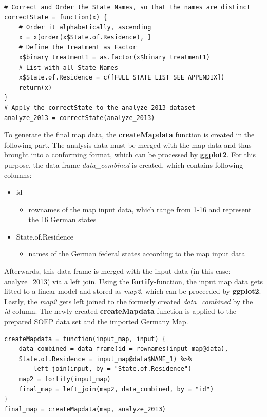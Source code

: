 \documentclass[a4paper]{article}
\begin{document}
{\begin{lstlisting}
# Correct and Order the State Names, so that the names are distinct
correctState = function(x) {
    # Order it alphabetically, ascending
    x = x[order(x$State.of.Residence), ]
    # Define the Treatment as Factor
    x$binary_treatment1 = as.factor(x$binary_treatment1)
    # List with all State Names
    x$State.of.Residence = c([FULL STATE LIST SEE APPENDIX])
    return(x)
}
# Apply the correctState to the analyze_2013 dataset
analyze_2013 = correctState(analyze_2013)
\end{lstlisting}
To generate the final map data, the \textbf{createMapdata} function is created in the following part. 
The analysis data must be merged with the map data and thus brought into a conforming format, which can be processed by \textbf{ggplot2}. For this purpose, the data frame \textit{data\_combined} is created, which contains following columns:
\begin{itemize}
\item id 
\begin{itemize}
\item rownames of the map input data, which range from 1-16 and represent the 16 German states
\end{itemize}
\item State.of.Residence 
\begin{itemize}
\item names of the German federal states according to the map input data
\end{itemize}
\end{itemize}

Afterwards, this data frame is merged with the input data (in this case: analyze\_2013) via a left join. Using the \textbf{fortify}-function, the input map data gets fitted to a linear model and stored as \textit{map2}, which can be proceeded by \textbf{ggplot2}. Lastly, the \textit{map2} gets left joined to the formerly created \textit{data\_combined} by the \textit{id}-column.
The newly created \textbf{createMapdata} function is applied to the prepared SOEP data set and the imported Germany Map.

\begin{lstlisting}
createMapdata = function(input_map, input) {
    data_combined = data_frame(id = rownames(input_map@data), 
    State.of.Residence = input_map@data$NAME_1) %>%
        left_join(input, by = "State.of.Residence")
    map2 = fortify(input_map)
    final_map = left_join(map2, data_combined, by = "id")
}
final_map = createMapdata(map, analyze_2013)
\end{lstlisting}

}
\end{document}
